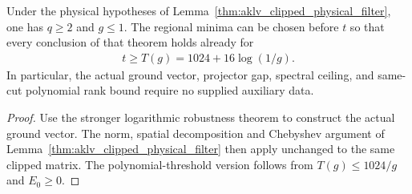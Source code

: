 \begin{lemma}
    \label{cor:aklv_logarithmic_clipped_filter}
    \leanok
    Under the physical hypotheses of
    Lemma~\ref{thm:aklv_clipped_physical_filter}, one has $q\ge2$ and
    $g\le1$. The regional minima can be chosen before $t$ so that every
    conclusion of that theorem holds already for
    \begin{align*}
        t\ge T(g)=1024+16\log(1/g).
    \end{align*}
    In particular, the actual ground vector, projector gap, spectral ceiling,
    and same-cut polynomial rank bound require no supplied auxiliary data.
\end{lemma}
\begin{proof}
    \leanok
    Use the stronger logarithmic robustness theorem to construct the
    actual ground vector. The norm, spatial decomposition and Chebyshev
    argument of Lemma~\ref{thm:aklv_clipped_physical_filter} then apply
    unchanged to the same clipped matrix. The polynomial-threshold
    version follows from $T(g)\le1024/g$ and $E_0\ge0$.
\end{proof}
